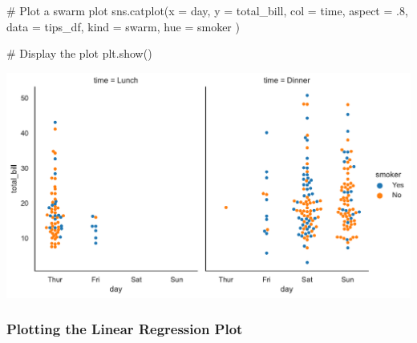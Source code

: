 \documentclass[
  letterpaper,
  DIV=11,
  numbers=noendperiod]{scrartcl}
\newenvironment{Shaded}{\begin{snugshade}}{\end{snugshade}}
\newcommand{\CommentTok}[1]{\textcolor[rgb]{0.37,0.37,0.37}{#1}}
\newcommand{\FloatTok}[1]{\textcolor[rgb]{0.68,0.00,0.00}{#1}}
\newcommand{\NormalTok}[1]{\textcolor[rgb]{0.00,0.46,0.62}{#1}}
\newcommand{\OperatorTok}[1]{\textcolor[rgb]{0.37,0.37,0.37}{#1}}
\newcommand{\StringTok}[1]{\textcolor[rgb]{0.13,0.47,0.30}{#1}}
\begin{document}
\begin{Shaded}
\begin{Highlighting}[]
\CommentTok{\# Plot a swarm plot}
\NormalTok{sns.catplot(x }\OperatorTok{=} \StringTok{\textquotesingle{}day\textquotesingle{}}\NormalTok{, }
\NormalTok{            y }\OperatorTok{=} \StringTok{\textquotesingle{}total\_bill\textquotesingle{}}\NormalTok{, }
\NormalTok{            col }\OperatorTok{=} \StringTok{\textquotesingle{}time\textquotesingle{}}\NormalTok{, }
\NormalTok{            aspect }\OperatorTok{=} \FloatTok{.8}\NormalTok{, }
\NormalTok{            data }\OperatorTok{=}\NormalTok{ tips\_df,}
\NormalTok{            kind }\OperatorTok{=} \StringTok{\textquotesingle{}swarm\textquotesingle{}}\NormalTok{,}
\NormalTok{            hue }\OperatorTok{=} \StringTok{\textquotesingle{}smoker\textquotesingle{}}
\NormalTok{            )}
            
\CommentTok{\# Display the plot}
\NormalTok{plt.show()}
\end{Highlighting}
\end{Shaded}

\includegraphics{data_visualization_with_seaborn_files/figure-pdf/cell-21-output-1.pdf}

\hypertarget{plotting-the-linear-regression-plot}{%
\subsubsection{Plotting the Linear Regression
Plot}\label{plotting-the-linear-regression-plot}}
\end{document}
